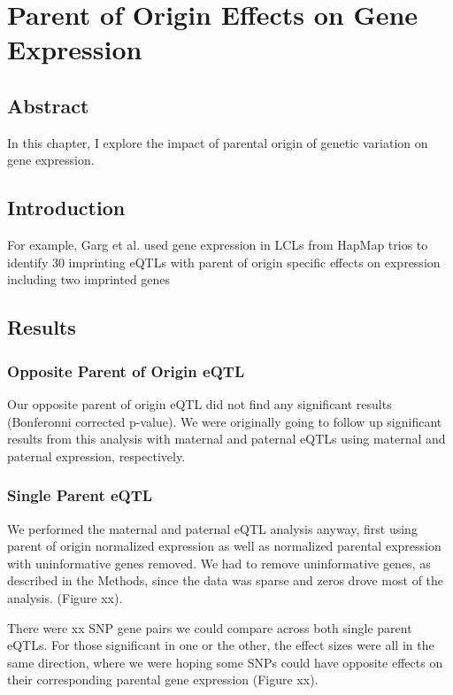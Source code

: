 \chapter{Parent of Origin Effects on Gene Expression }\label{ch:poeqtl}
\section[Abstract]{Abstract}

In this chapter, I explore the impact of parental origin of genetic variation on gene expression. 


\section{Introduction}\label{ch04-introduction}

For example, Garg et al. used gene expression in LCLs from HapMap trios to identify 30 imprinting eQTLs with parent of origin specific effects on expression including two imprinted genes\cite{Garg2012a}

\section{Results}\label{ch04-results}
\subsection{Opposite Parent of Origin eQTL}\label{Opposite Parent of Origin eQTL} 
Our opposite parent of origin eQTL did not find any significant results (Bonferonni corrected p-value). We were originally going to follow up significant results from this analysis with maternal and paternal eQTLs using maternal and paternal expression, respectively. 

\subsection{Single Parent eQTL}\label{Single Parent eQTL} 
We performed the maternal and paternal eQTL analysis anyway, first using parent of origin normalized expression as well as normalized parental expression with uninformative genes removed. We had to remove uninformative genes, as described in the Methods, since the data was sparse and zeros drove most of the analysis.  (Figure xx). 

There were xx SNP gene pairs we could compare across both single parent eQTLs. For those significant in one or the other, the effect sizes were all in the same direction, where we were hoping some SNPs could have opposite effects on their corresponding parental gene expression (Figure xx).

